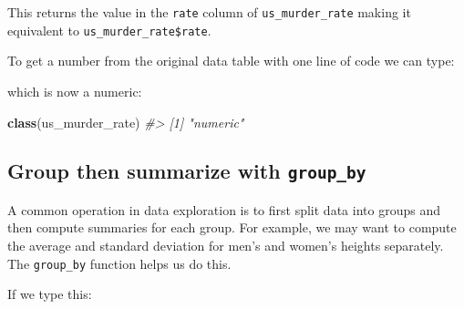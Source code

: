 \documentclass[
]{krantz}
\newenvironment{Shaded}{\begin{snugshade}}{\end{snugshade}}
\newcommand{\CommentTok}[1]{\textcolor[rgb]{0.37,0.37,0.37}{\textit{#1}}}
\newcommand{\DataTypeTok}[1]{\textcolor[rgb]{0.27,0.27,0.27}{#1}}
\newcommand{\DecValTok}[1]{\textcolor[rgb]{0.06,0.06,0.06}{#1}}
\newcommand{\KeywordTok}[1]{\textcolor[rgb]{0.27,0.27,0.27}{\textbf{#1}}}
\newcommand{\NormalTok}[1]{#1}
\newcommand{\OperatorTok}[1]{\textcolor[rgb]{0.43,0.43,0.43}{\textbf{#1}}}
\newcommand{\StringTok}[1]{\textcolor[rgb]{0.5,0.5,0.5}{#1}}
\begin{document}
\begin{Shaded}
\end{Shaded}

This returns the value in the \texttt{rate} column of \texttt{us\_murder\_rate} making it equivalent to \texttt{us\_murder\_rate\$rate}.

To get a number from the original data table with one line of code we can type:

\begin{Shaded}
\end{Shaded}

which is now a numeric:

\begin{Shaded}
\begin{Highlighting}[]
\KeywordTok{class}\NormalTok{(us_murder_rate)}
\CommentTok{#> [1] "numeric"}
\end{Highlighting}
\end{Shaded}

\hypertarget{group-by}{%
\subsection{\texorpdfstring{Group then summarize with \texttt{group\_by}}{Group then summarize with group\_by}}\label{group-by}}

A common operation in data exploration is to first split data into groups and then compute summaries for each group. For example, we may want to compute the average and standard deviation for men's and women's heights separately. The \texttt{group\_by} function helps us do this.

If we type this:

\begin{Shaded}
\end{Shaded}
\end{document}
